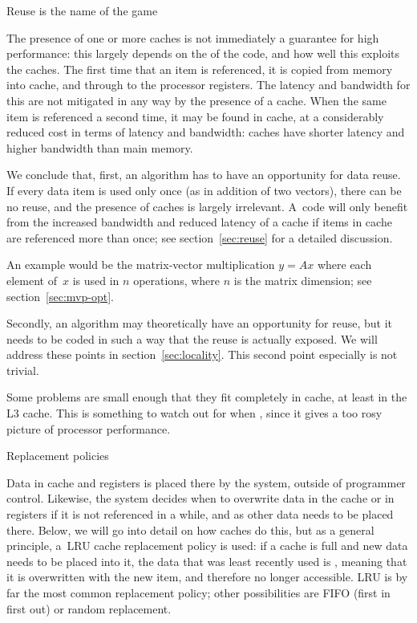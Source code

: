  {Reuse is the name of the game}

The presence of one or more caches is not immediately a guarantee for
high performance: this largely depends on the  of the code, and how well this exploits the caches.
The first time that an item is
referenced, it is copied from memory into cache, and through to the
processor registers. The latency and bandwidth for this are not mitigated in any
way by the presence of a cache. When the same item is referenced a
second time, it may be found in cache, at a considerably reduced cost
in terms of latency and bandwidth: caches have shorter latency and
higher bandwidth than main memory.

We conclude that, first, an algorithm has to have an opportunity for
data reuse. If every data item is used only once (as in addition of
two vectors), there can be no reuse, and the presence of caches is
largely irrelevant. A~code will only benefit from the increased
bandwidth and reduced latency of a cache if items in cache are
referenced more than once; see section~\ref{sec:reuse} for a detailed
discussion.
\begin{nopackt}
  An example would be the matrix-vector multiplication
  $y=Ax$ where each element of~$x$ is used in $n$ operations, where $n$
  is the matrix dimension;
  see section~\ref{sec:mvp-opt}.
\end{nopackt}

Secondly, an algorithm may theoretically
have an opportunity for reuse, but it needs to be coded in such a way
that the reuse is actually exposed. We will address these points in
section~\ref{sec:locality}. This second point especially is not
trivial.


Some problems are small enough that they fit completely in cache, at
least in the L3 cache. This is something to watch out for when
, since it gives a too rosy picture of
processor performance.

 {Replacement policies}
\label{sec:lru}


Data in cache and registers is placed there by the system, outside of
programmer control. Likewise, the system decides when to overwrite
data in the cache or in registers if it is not referenced in a while,
and as other data needs to be placed there.  Below, we will go into
detail on how caches do this, but as a general principle,
a~\acf{LRU} cache replacement policy is used:
if a cache is full and new data
needs to be placed into it, the data that was least recently used is
,
meaning that it is overwritten with the new item,
and therefore no longer accessible. LRU is by far the most common
replacement policy; other possibilities are FIFO (first in first out)
or random replacement.

